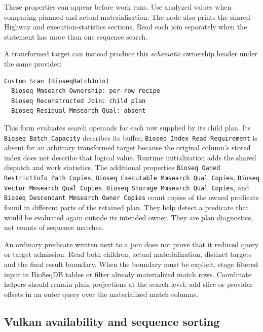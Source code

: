 These properties can appear before work runs. Use analyzed values when
comparing planned and actual materialization. The node also prints the shared
Highway and execution-statistics sections. Read each join separately when the
statement has more than one sequence search.

A transformed target can instead produce this \emph{schematic} ownership
header under the same provider:

\par\noindent\begin{minipage}{\linewidth}
\begin{lstlisting}[style=bioseq-appendix-text]
Custom Scan (BioseqBatchJoin)
  Bioseq Mmsearch Ownership: per-row recipe
  Bioseq Reconstructed Join: child plan
  Bioseq Residual Mmsearch Qual: absent
\end{lstlisting}
\end{minipage}

This form evaluates search operands for each row supplied by its child plan.
Its \texttt{Bioseq Batch Capacity} describes its buffer;
\texttt{Bioseq Index Read Requirement} is absent for an arbitrary transformed
target because the original column's stored index does not describe that
logical value. Runtime initialization adds the shared dispatch and work
statistics. The additional properties
\texttt{Bioseq Owned RestrictInfo Path Copies},
\texttt{Bioseq Executable Mmsearch Qual Copies},
\texttt{Bioseq Vector Mmsearch Qual Copies},
\texttt{Bioseq Storage Mmsearch Qual Copies}, and
\texttt{Bioseq Descendant Mmsearch Owner Copies} count copies of the owned
predicate found in different parts of the retained plan. They help detect a
predicate that would be evaluated again outside its intended owner. They are
plan diagnostics, not counts of sequence matches.

An ordinary predicate written next to a join does not prove that it reduced
query or target admission. Read both children, actual materialization,
distinct targets and the final result boundary. When the boundary must be
explicit, stage filtered input in BioSeqDB tables or filter already
materialized match rows. Coordinate helpers should remain plain projections
at the search level; add slice or provider offsets in an outer query over the
materialized match columns.

\subsection{Vulkan availability and sequence sorting}

